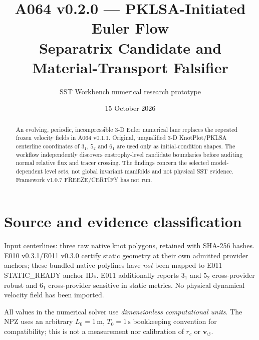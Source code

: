 \documentclass[10pt,a4paper]{article}
\title{A064 v0.2.0 --- PKLSA-Initiated Euler Flow\\Separatrix Candidate and Material-Transport Falsifier}
\author{SST Workbench numerical research prototype}
\date{15 October 2026}
\begin{document}
\maketitle
\begin{abstract}
An evolving, periodic, incompressible 3-D Euler numerical lane replaces the repeated frozen velocity fields in A064 v0.1.1. Original, unqualified 3-D KnotPlot/PKLSA centerline coordinates of $3_1$, $5_2$ and $6_1$ are used only as initial-condition shapes. The workflow independently discovers enstrophy-level candidate boundaries before auditing normal relative flux and tracer crossing. The findings concern the selected model-dependent level sets, not global invariant manifolds and not physical SST evidence. Framework v1.0.7 FREEZE/CERTIFY has not run.
\end{abstract}
\section{Source and evidence classification}
Input centerlines: three raw native knot polygons, retained with SHA-256 hashes. E010 v0.3.1/E011 v0.3.0 certify static geometry at their own admitted provider anchors; these bundled native polylines have \emph{not} been mapped to E011 STATIC\_READY anchor IDs. E011 additionally reports $3_1$ and $5_2$ cross-provider robust and $6_1$ cross-provider sensitive in static metrics. No physical dynamical velocity field has been imported.
\par All values in the numerical solver use \emph{dimensionless computational units}. The NPZ uses an arbitrary $L_0=1\,\mathrm m$, $T_0=1\,\mathrm s$ bookkeeping convention for compatibility; this is not a measurement nor calibration of $r_c$ or $\mathbf v_{\!\boldsymbol{\circlearrowleft}}$.
\end{document}
